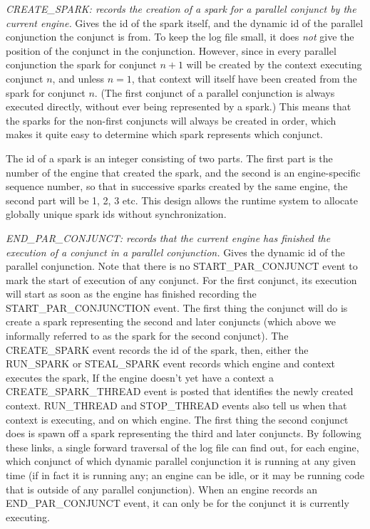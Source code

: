 \emph{CREATE\_SPARK: records the creation of a spark
for a parallel conjunct by the current engine.}
Gives the id of the spark itself,
and the dynamic id of the parallel conjunction the conjunct is from.
To keep the log file small,
it does \emph{not} give the position of the conjunct in the conjunction.
However, since in every parallel conjunction
the spark for conjunct $n+1$
will be created by the context executing conjunct $n$,
and unless $n=1$, that context will itself have been created
from the spark for conjunct $n$.
(The first conjunct of a parallel conjunction is always executed directly,
without ever being represented by a spark.)
This means that the sparks for the non-first conjuncts
will always be created in order,
which makes it quite easy to determine which spark represents which conjunct.

The id of a spark is an integer consisting of two parts.
The first part is the number of the engine that created the spark,
and the second is an engine-specific sequence number,
so that in successive sparks created by the same engine,
the second part will be 1, 2, 3 etc.
This design allows the runtime system
to allocate globally unique spark ids without synchronization.

\emph{END\_PAR\_CONJUNCT:
records that the current engine
has finished the execution of a conjunct in a parallel conjunction.}
Gives the dynamic id of the parallel conjunction.
Note that there is no START\_PAR\_CONJUNCT event
to mark the start of execution of any conjunct.
For the first conjunct, its execution will start
as soon as the engine has finished recording the START\_PAR\_CONJUNCTION event.
The first thing the conjunct will do is create a spark
representing the second and later conjuncts
(which above we informally referred to as the spark for the second conjunct).
The CREATE\_SPARK event records the id of the spark,
then, either the RUN\_SPARK or STEAL\_SPARK event records which engine and context
executes the spark,
If the engine doesn't yet have a context a CREATE\_SPARK\_THREAD event is posted
that identifies the newly created context.
RUN\_THREAD and STOP\_THREAD events
also tell us when that context is executing, and on which engine.
The first thing the second conjunct does is spawn off a spark
representing the third and later conjuncts.
By following these links,
a single forward traversal of the log file can find out,
for each engine, which conjunct of which dynamic parallel conjunction
it is running at any given time
(if in fact it is running any;
an engine can be idle,
or it may be running code that is outside of any parallel conjunction).
When an engine records an END\_PAR\_CONJUNCT event,
it can only be for the conjunct it is currently executing.

